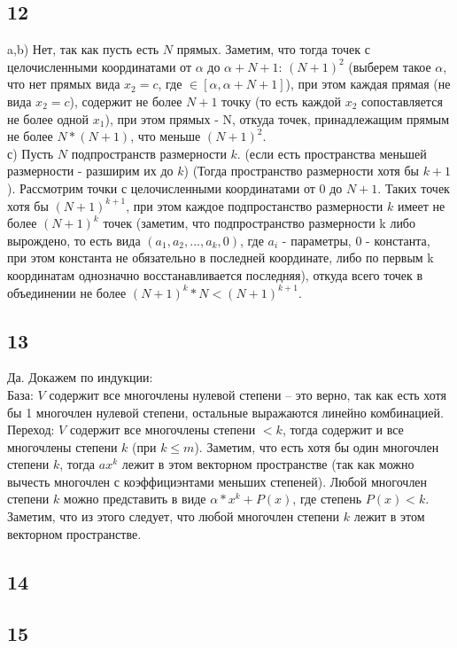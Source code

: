 		\subsection{12}
		a,b) Нет, так как пусть есть $N$ прямых. Заметим, что тогда точек с целочисленными координатами от $\alpha$ до $\alpha + N+1$: $(N+1)^2$ (выберем такое $\alpha$, что нет прямых вида $x_2 = c$, где $\in [\alpha,\alpha + N + 1]$), при этом каждая прямая (не вида $x_2 = c$), содержит не более $N+1$ точку (то есть каждой $x_2$ сопоставляется не более одной $x_1$), при этом прямых - N, откуда точек, принадлежащим прямым не более $N*(N+1)$, что меньше $(N+1)^2$.\\
		с) Пусть $N$ подпространств размерности $k$. (если есть пространства меньшей размерности - разширим их до $k$) (Тогда пространство размерности хотя бы $k+1$). Рассмотрим точки с целочисленными координатами от $0$ до $N+1$. Таких точек хотя бы $(N+1)^{k+1}$, при этом каждое подпростанство размерности $k$ имеет не более $(N+1)^k$ точек (заметим, что подпространство размерности k либо вырождено, то есть вида $(a_1,a_2,...,a_k,0)$, где $a_i$ - параметры, $0$ - константа, при этом константа не обязательно в последней координате, либо по первым k координатам однозначно восстанавливается последняя), откуда всего точек в объединении не более $(N+1)^k*N < (N+1)^{k+1}$.
		
		\subsection{13}
		Да. Докажем по индукции:\\
		База: $V$ содержит все многочлены нулевой степени -- это верно, так как есть хотя бы 1 многочлен нулевой степени, остальные выражаются линейно комбинацией.
		Переход: $V$ содержит все многочлены степени $< k$, тогда содержит и все многочлены степени $k$ (при $k \leq m$). Заметим, что есть хотя бы один многочлен степени $k$, тогда $ax^k$ лежит в этом векторном пространстве (так как можно вычесть многочлен с коэффициэнтами меньших степеней). Любой многочлен степени $k$ можно представить в виде $\alpha*x^k + P(x)$, где степень $P(x) < k$. Заметим, что из этого следует, что любой многочлен степени $k$ лежит в этом векторном пространстве.
		
		\subsection{14}
		
		\subsection{15}
		
